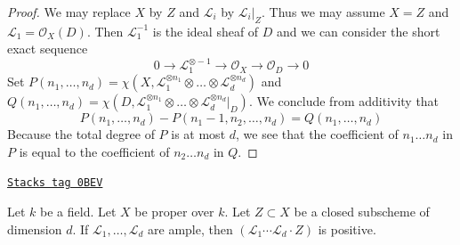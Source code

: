 \begin{proof}
We may replace $X$ by $Z$ and $\mathcal{L}_i$ by $\mathcal{L}_i|_Z$.
Thus we may assume $X = Z$ and $\mathcal{L}_1 = \mathcal{O}_X(D)$.
Then $\mathcal{L}_1^{-1}$ is the ideal sheaf of $D$ and we can
consider the short exact sequence
$$
0 \to \mathcal{L}_1^{\otimes -1} \to \mathcal{O}_X \to \mathcal{O}_D \to 0
$$
Set
$P(n_1, \ldots, n_d) =
\chi(X, \mathcal{L}_1^{\otimes n_1} \otimes \ldots \otimes
\mathcal{L}_d^{\otimes n_d})$
and
$Q(n_1, \ldots, n_d) =
\chi(D, \mathcal{L}_1^{\otimes n_1} \otimes \ldots \otimes
\mathcal{L}_d^{\otimes n_d}|_D)$.
We conclude from additivity that
$$
P(n_1, \ldots, n_d) - P(n_1 - 1, n_2, \ldots, n_d) =
Q(n_1, \ldots, n_d)
$$
Because the total degree of $P$ is at most $d$, we see that
the coefficient of $n_1 \ldots n_d$ in $P$ is equal to the coefficient
of $n_2 \ldots n_d$ in $Q$.
\end{proof}

\begin{lemma}
\label{varieties-lemma-ample-positive}
\href{https://stacks.math.columbia.edu/tag/0BEV}{\texttt{Stacks tag 0BEV}}

Let $k$ be a field. Let $X$ be proper over $k$. Let $Z \subset X$ be
a closed subscheme of dimension $d$. If $\mathcal{L}_1, \ldots, \mathcal{L}_d$
are ample, then $(\mathcal{L}_1 \cdots \mathcal{L}_d \cdot Z)$ is positive.
\end{lemma}

